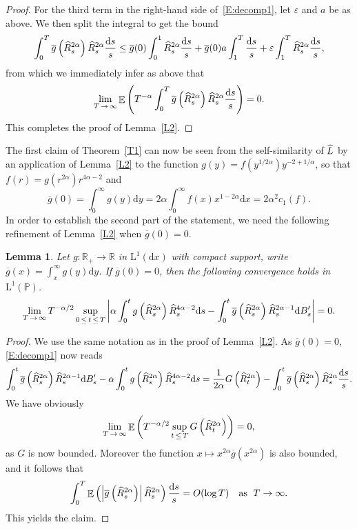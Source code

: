 \documentclass[10pt]{amsart}
\newtheorem{lemm}[theo]{Lemma}\newtheorem{prop}[theo]{Proposition}\newtheorem{coro}[theo]{Corollary}\newtheorem{conj}[theo]{Conjecture}
\theoremstyle{definition}\newtheorem{defi}[theo]{Definition}\newtheorem{rema}[theo]{Remark}\newtheorem{exam}[theo]{Example}\newtheorem{exem}[theo]{Example}\newtheorem{nota}[theo]{Notation}
\renewcommand{\bar}[1]{\overline{#1}}
\renewcommand{\hat}[1]{\widehat{#1}}
\newcommand{\dd}{\mathrm{d}}
\newcommand{\rmL}{\mathrm{L}}
\DeclareMathOperator{\E}{\mathbb{E}}
\renewcommand{\P}{\mathbb{P}}
\newcommand{\R}{\mathbb{R}}
\let\oldhat\hat
\renewcommand*{\hat}[1]{\mathchoice{\widehat{#1}}{\widehat{#1}}{\oldhat{#1}}{\oldhat{#1}}}
\begin{document}
\begin{proof}
For the third term in the right-hand side of~\eqref{E:decomp1}, let $\varepsilon$ and $a$ be as above. We then split the integral to get the bound
\[
\int_0^T \bar g\left(\hat R^{2\alpha}_s\right) \hat R^{2\alpha}_s \frac{\dd s}{s}
\leq \bar g(0) \int_0^1 \hat R^{2\alpha}_s \frac{\dd s}{s} +\bar g(0) a \int_1^T \frac{\dd s}{s} + \varepsilon \int_1^T \hat R^{2\alpha}_s \frac{\dd s}{s},
\]
from which we immediately infer as above that
\[
\lim_{T\,\to\,\infty} \E\left(T^{-\alpha} \int_0^T \bar g\left(\hat R^{2\alpha}_s\right) \hat R^{2\alpha}_s \frac{\dd s}{s}\right)=0.
\]
This completes the proof of Lemma~\ref{L2}.
\end{proof}

The first claim of Theorem~\ref{T1} can now be seen from the self-similarity of $\hat{L}$ by an application of Lemma~\ref{L2} to the function $g(y)=f(y^{1/2\alpha}) y^{-2+1/\alpha}$, so that $f(r)= g(r^{2\alpha}) r^{4\alpha-2}$ and
\[
\bar g(0)=\int_0^{\infty} g(y) \dd y = 2\alpha \int_0^{\infty} f(x) x^{1-2\alpha} \dd x = 2\alpha^2 c_1(f).
\]
In order to establish the second part of the statement, we need the following refinement of Lemma~\ref{L2} when $\bar g(0)=0$.

\begin{lemm}\label{L3}
Let $g: \R_+\to \R$ in $\rmL^1(\dd x)$ with compact support, write $\bar g(x)=\int_x^{\infty}g(y)\dd y$. If $\bar g(0)=0$, then the following convergence holds in $\rmL^1(\P)$.
\[
\lim_{T\,\to\,\infty} T^{-\alpha/2} \sup_{0\,\leq\,t\,\leq \,T} \left| \alpha \int_0^{t} g\left(\hat R^{2\alpha}_s\right)\hat R_s^{4\alpha-2} \dd s - \int_0^t \bar g\left(\hat R^{2\alpha}_s\right) \hat R_s^{2\alpha-1} \dd B'_s \right| = 0.
\]
\end{lemm}

\begin{proof}
We use the same notation as in the proof of Lemma~\ref{L2}. As $\bar g(0)=0$, \eqref{E:decomp1} now reads
\[
\int_0^t \bar g\left(\hat R^{2\alpha}_s\right) \hat R_s^{2\alpha-1} \dd B'_s-\alpha \int_0^{t} g\left(\hat R^{2\alpha}_s\right)\hat R_s^{4\alpha-2} \dd s = \frac{1}{2\alpha} G\left(\hat R_t^{2\alpha}\right) - \int_0^t \bar g\left(\hat R^{2\alpha}_s\right) \hat R^{2\alpha}_s \frac{\dd s}{s}.
\]
We have obviously
\[
\lim_{T\,\to\,\infty} \E\left(T^{-\alpha/2} \sup_{t\,\leq\,T} G\left(\hat R_t^{2\alpha}\right)\right)=0,
\]
as $G$ is now bounded. Moreover the function $x \mapsto x^{2\alpha}\bar g(x^{2\alpha})$ is also bounded, and it follows that
\[
\int_0^T \E\left(\left|\bar g\left(\hat R^{2\alpha}_s\right)\right| \hat R^{2\alpha}_s\right)\frac{\dd s}{s} = O(\log T) \quad \text{as }\;T\to \infty.
\]
This yields the claim.
\end{proof}
\end{document}
